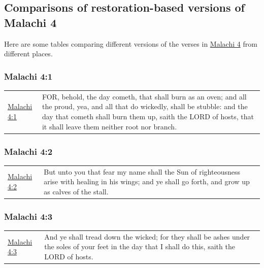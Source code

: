 	\subsection{Comparisons of restoration-based versions of Malachi 4}
		\label{EXSS-OT-MALACHI-4-VERSIONS}
		
		Here are some tables comparing different versions of the verses in \hyperref[MALACHI-4]{Malachi 4} from different places.
		
		\subsubsection{Malachi 4:1}
		
			\begin{table}[H]
			\begin{tabular}{p{3cm}p{12cm}}
			\hyperref[MALACHI-4-1]{Malachi 4:1} & FOR, behold, the day cometh, that shall burn as an oven; and all the proud, yea, and all that do wickedly, shall be stubble: and the day that cometh shall burn them up, saith the LORD of hosts, that it shall leave them neither root nor branch.
			\end{tabular}
			\end{table}
			
		\subsubsection{Malachi 4:2}
		
			\begin{table}[H]
			\begin{tabular}{p{3cm}p{12cm}}
			\hyperref[MALACHI-4-2]{Malachi 4:2} & But unto you that fear my name shall the Sun of righteousness arise with healing in his wings; and ye shall go forth, and grow up as calves of the stall.
			\end{tabular}
			\end{table}
			
		\subsubsection{Malachi 4:3}
		
			\begin{table}[H]
			\begin{tabular}{p{3cm}p{12cm}}
			\hyperref[MALACHI-4-3]{Malachi 4:3} & And ye shall tread down the wicked; for they shall be ashes under the soles of your feet in the day that I shall do this, saith the LORD of hosts.
			\end{tabular}
			\end{table}
			
